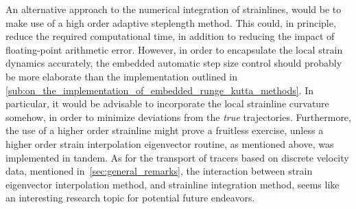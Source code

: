 An alternative approach to the numerical integration of strainlines, would be
to make use of a high order adaptive steplength method. This could, in
principle, reduce the required computational time, in addition to reducing
the impact of floating-point arithmetic error. However, in order to encapsulate
the local strain dynamics accurately, the embedded automatic step size control
should probably be more elaborate than the implementation outlined in
\cref{sub:on_the_implementation_of_embedded_runge_kutta_methods}. In particular,
it would be advisable to incorporate the local strainline curvature somehow,
in order to minimize deviations from the \emph{true} trajectories. Furthermore,
the use of a higher order strainline might prove a fruitless exercise, unless
a higher order strain interpolation eigenvector routine, as mentioned above, was
implemented in tandem. As for the transport of tracers based on discrete
velocity data, mentioned in~\cref{sec:general_remarks}, the interaction
between strain eigenvector interpolation method, and strainline integration
method, seems like an interesting research topic for potential future endeavors.

%
